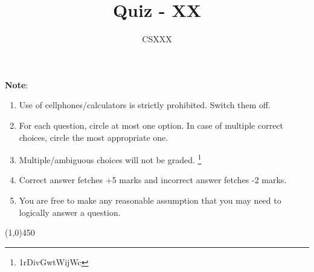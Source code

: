 \documentclass[10pt, letterpaper]{article}
\begin{document}
\title{Quiz - XX}
\author{CSXXX}
\date{}

\maketitle
\vspace{-0.25in}


\textbf{Note}:
\begin{enumerate}
\item Use of cellphones/calculators is strictly prohibited. Switch them off.  
\item For each question, circle at most one option. In case of multiple correct choices, circle the most appropriate one.
\item Multiple/ambiguous choices will not be graded. {\let\thefootnote\relax\footnote{1rDivGwtWijWc}}
\item Correct answer fetches +5 marks and incorrect answer fetches -2 marks.
\item You are free to make any reasonable assumption that you may need to logically answer a question.
\end{enumerate}
\vspace{-0.25in}
\begin{center}
\line(1,0){450}
\end{center}
\end{document}
